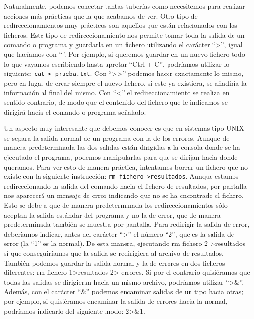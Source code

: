 \documentclass[12pt]{article}
\begin{document}
Naturalmente, podemos conectar tantas tuberías como necesitemos para realizar 
acciones más prácticas que la que acabamos de ver. Otro tipo de 
redireccionamientos muy prácticos son aquellos que están relacionados con los 
ficheros. Este tipo de redireccionamiento nos permite tomar toda la salida de 
un comando o programa y guardarla en un fichero utilizando el carácter ``\textgreater'', 
igual que hacíamos con ``\textbar''. Por ejemplo, si queremos guardar en un nuevo 
fichero todo lo que vayamos escribiendo hasta apretar ``Ctrl + C'', podríamos 
utilizar lo siguiente: \texttt{cat > prueba.txt}. Con ``\textgreater \textgreater'' 
podemos hacer exactamente 
lo mismo, pero en lugar de crear siempre el nuevo fichero, si este ya 
existiera, se añadiría la información al final del mismo. Con ``\textless'' el 
redireccionamiento se realiza en sentido contrario, de modo que el 
contenido del fichero que le indicamos se dirigirá hacia el comando o programa 
señalado.

Un aspecto muy interesante que debemos conocer es que en sistemas tipo UNIX 
se separa la salida normal de un programa con la de los errores. Aunque de  
manera predeterminada las dos salidas están dirigidas a la consola donde 
se ha ejecutado el programa, podemos manipularlas para que se dirijan hacia 
donde queramos. Para ver esto de manera práctica, intentamos borrar un fichero 
que no existe con la siguiente instrucción: \texttt{rm fichero \textgreater resultados}. Aunque 
estamos redireccionando la salida del comando hacia el fichero de resultados, 
por pantalla nos aparecerá un mensaje de error indicando que no se ha encontrado 
el fichero. Esto se debe a que de manera predeterminada los redireccionamientos sólo aceptan 
la salida estándar del programa y no la de error, que de manera predeterminada también se 
muestra por pantalla. Para redirigir la salida de error, deberíamos indicar, 
antes del carácter ``\textgreater'' el número ``2'', que es la salida de error (la ``1'' es la 
normal). De esta manera, ejecutando rm fichero 2 \textgreater resultados sí que conseguiríamos
que la salida se redirigiera al archivo de resultados. También podemos guardar 
la salida normal y la de errores en dos ficheros diferentes: rm fichero 1\textgreater resultados 2\textgreater 
errores. Si por el contrario quisiéramos que todas las salidas se dirigieran
 hacia un mismo archivo, podríamos utilizar ``\textgreater\&''. Además, con el carácter ``\&'' 
podemos encaminar salidas de un tipo hacia otras; por ejemplo, si quisiéramos 
encaminar la salida de errores hacia la normal, podríamos indicarlo del 
siguiente modo: 2\textgreater\&1.
\end{document}
